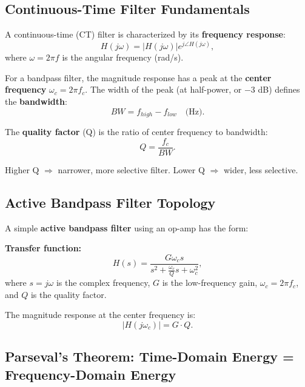 \documentclass[11pt,letterpaper]{article}
\begin{document}
\subsection{Continuous-Time Filter Fundamentals}

A continuous-time (CT) filter is characterized by its \textbf{frequency response}:
\begin{equation}
H(j\omega) = |H(j\omega)| e^{j\angle H(j\omega)},
\end{equation}
where $\omega = 2\pi f$ is the angular frequency (rad/s).

For a bandpass filter, the magnitude response has a peak at the \textbf{center frequency} $\omega_c = 2\pi f_c$. The width of the peak (at half-power, or $-3$ dB) defines the \textbf{bandwidth}:
\begin{equation}
BW = f_{high} - f_{low} \quad \text{(Hz)}.
\end{equation}

The \textbf{quality factor} (Q) is the ratio of center frequency to bandwidth:
\begin{equation}
Q = \frac{f_c}{BW}.
\end{equation}

Higher Q $\Rightarrow$ narrower, more selective filter. Lower Q $\Rightarrow$ wider, less selective.

\subsection{Active Bandpass Filter Topology}

A simple \textbf{active bandpass filter} using an op-amp has the form:

\textbf{Transfer function:}
\begin{equation}
H(s) = \frac{G \omega_c s}{s^2 + \frac{\omega_c}{Q} s + \omega_c^2},
\end{equation}
where $s = j\omega$ is the complex frequency, $G$ is the low-frequency gain, $\omega_c = 2\pi f_c$, and $Q$ is the quality factor.

The magnitude response at the center frequency is:
\begin{equation}
|H(j\omega_c)| = G \cdot Q.
\end{equation}

\subsection{Parseval's Theorem: Time-Domain Energy = Frequency-Domain Energy}
\end{document}
